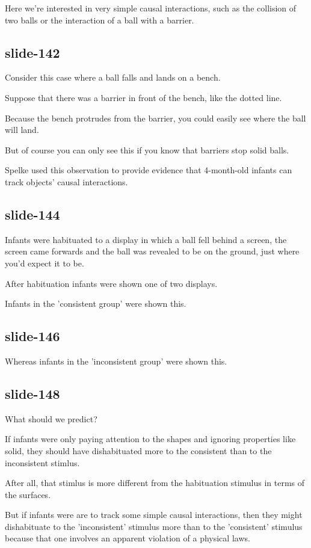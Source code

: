 \documentclass[12pt,\papersize]{extarticle}
\begin{document}
Here we're interested in very simple causal interactions, such as the collision of two balls or the interaction of a ball with a barrier.
 
\subsection{slide-142}
Consider this case where a ball falls and lands on a bench.
 
Suppose that there was a barrier in front of the bench, like the dotted line.
 
Because the bench protrudes from the barrier, you could easily see where the ball will land.
 
But of course you can only see this if you know that barriers stop solid balls.
 
Spelke used this observation to provide evidence that 4-month-old infants can track objects' causal interactions.
 
\subsection{slide-144}
Infants were habituated to a display in which a ball fell behind a screen, the screen came forwards and the ball was revealed to be on the ground, just where you'd expect it to be.
 
After habituation infants were shown one of two displays.
 
Infants in the 'consistent group' were shown this.
 
\subsection{slide-146}
Whereas infants in the 'inconsistent group' were shown this.
 
\subsection{slide-148}
What should we predict?
 
If infants were only paying attention to the shapes and ignoring properties like solid, they should have dishabituated more to the consistent than to the inconsistent stimlus.
 
After all, that stimlus is more different from the habituation stimulus in terms of the surfaces.
 
But if infants were are to track some simple causal interactions, then they might dishabituate to the 'inconsistent' stimulus more than to the 'consistent' stimulus because that one involves an apparent violation of a physical laws.
 
\end{document}
